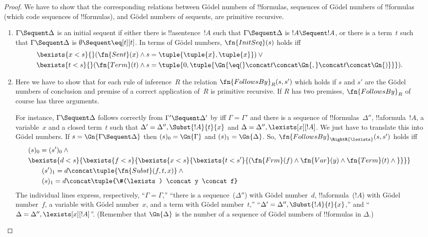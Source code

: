 \documentclass[../../../include/open-logic-section]{subfiles}
\begin{document}
\begin{proof}
We have to show that the corresponding relations between G\"odel
numbers of !!{formula}s, sequences of G\"odel numbers of !!{formula}s
(which code sequences of !!{formula}s), and G\"odel numbers of sequents,
are primitive recursive.
\begin{enumerate}
\item $\Gamma \Sequent \Delta$ is an initial sequent if either there
  is !!a{sentence}~$!A$ such that $\Gamma \Sequent \Delta$ is $!A
  \Sequent !A$, or there is a term~$t$ such that $\Gamma \Sequent
  \Delta$ is $\emptyset \Sequent \eq[t][t]$.  In terms of G\"odel
  numbers, $\fn{InitSeq}(s)$ holds iff
\begin{align*}
\bexists{x < s}{} (\fn{Sent}(x) & \land
s = \tuple{\tuple{x},\tuple{x}})
\lor {}\\
\bexists{t<s}{} (\fn{Term}(t) & \land
s = \tuple{0, \tuple{\Gn{{\eq}(} \concat t \concat \Gn{,} \concat t \concat \Gn{)}}}).
\end{align*}
\item Here we have to show that for each rule of inference~$R$ the
  relation $\fn{FollowsBy}_R(s, s')$ which holds if $s$ and $s'$ are
  the G\"odel numbers of conclusion and premise of a correct
  application of~$R$ is primitive recursive.  If $R$ has two premises,
  $\fn{FollowsBy}_R$ of course has three arguments.

For instance, $\Gamma \Sequent \Delta$ follows correctly from $\Gamma'
\Sequent \Delta'$ by \RightR{\lexists} iff $\Gamma = \Gamma'$ and
there is a sequence of !!{formula}s~$\Delta''$, !!a{formula}~$!A$, a
variable~$x$ and a closed term~$t$ such that $\Delta' = \Delta'',
\Subst{!A}{t}{x}$ and $\Delta = \Delta'', \lexists[x][!A]$. We just
have to translate this into G\"odel numbers.  If $s = \Gn{\Gamma
  \Sequent \Delta}$ then $(s)_0 = \Gn{\Gamma}$ and $(s)_1 =
\Gn{\Delta}$.  So, $\fn{FollowsBy}_{\RightR{\lexists}}(s, s')$
holds iff
\begin{align*}
& (s)_0 = (s')_0 \land {}\\
&
  \bexists{d<s}{\bexists{f<s}{\bexists{x<s}{\bexists{t<s'}{
          (\fn{Frm}(f) \land \fn{Var}(y) \land \fn{Term}(t) \land {}}}}} \\
  & \qquad (s')_1 = d \concat \tuple{\fn{Subst}(f,t,x)} \land {} \\
  & \qquad (s)_1 = d \concat \tuple{\#(\lexists) \concat y \concat f}
\end{align*}
The individual lines express, respectively, ``$\Gamma = \Gamma$,''
``there is a sequence~($\Delta''$) with G\"odel number~$d$,
!!a{formula}~($!A$) with G\"odel number~$f$, a variable with G\"odel
number~$x$, and a term with G\"odel number~$t$,'' ``$\Delta' =
\Delta'', \Subst{!A}{t}{x}$,'' and ``$\Delta = \Delta'',
\lexists[x][!A]$''. (Remember that $\Gn{\Delta}$ is the number of a
sequence of G\"odel numbers of !!{formula}s in $\Delta$.)


\end{enumerate}
\end{proof}
\end{document}
